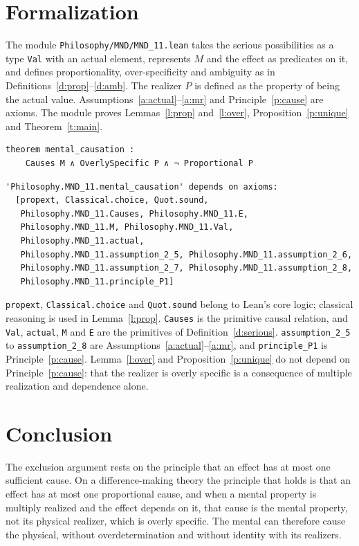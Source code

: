 \documentclass{situationist-preprint}
\begin{document}
\section{Formalization}

The module \nolinkurl{Philosophy/MND/MND_11.lean} takes the serious possibilities as a type \texttt{Val} with an actual element, represents $M$ and the effect as predicates on it, and defines proportionality, over-specificity and ambiguity as in Definitions~\ref{d:prop}--\ref{d:amb}. The realizer $P$ is defined as the property of being the actual value. Assumptions~\ref{a:actual}--\ref{a:mr} and Principle~\ref{p:cause} are axioms. The module proves Lemmas~\ref{l:prop} and~\ref{l:over}, Proposition~\ref{p:unique} and Theorem~\ref{t:main}.

\begin{lstlisting}
theorem mental_causation :
    Causes M ∧ OverlySpecific P ∧ ¬ Proportional P
\end{lstlisting}

\begin{lstlisting}
'Philosophy.MND_11.mental_causation' depends on axioms:
  [propext, Classical.choice, Quot.sound,
   Philosophy.MND_11.Causes, Philosophy.MND_11.E,
   Philosophy.MND_11.M, Philosophy.MND_11.Val,
   Philosophy.MND_11.actual,
   Philosophy.MND_11.assumption_2_5, Philosophy.MND_11.assumption_2_6,
   Philosophy.MND_11.assumption_2_7, Philosophy.MND_11.assumption_2_8,
   Philosophy.MND_11.principle_P1]
\end{lstlisting}

\texttt{propext}, \texttt{Classical.choice} and \texttt{Quot.sound} belong to Lean's core logic; classical reasoning is used in Lemma~\ref{l:prop}. \texttt{Causes} is the primitive causal relation, and \texttt{Val}, \texttt{actual}, \texttt{M} and \texttt{E} are the primitives of Definition~\ref{d:serious}. \texttt{assumption\_2\_5} to \texttt{assumption\_2\_8} are Assumptions~\ref{a:actual}--\ref{a:mr}, and \texttt{principle\_P1} is Principle~\ref{p:cause}. Lemma~\ref{l:over} and Proposition~\ref{p:unique} do not depend on Principle~\ref{p:cause}: that the realizer is overly specific is a consequence of multiple realization and dependence alone.

\section{Conclusion}

The exclusion argument rests on the principle that an effect has at most one sufficient cause. On a difference-making theory the principle that holds is that an effect has at most one proportional cause, and when a mental property is multiply realized and the effect depends on it, that cause is the mental property, not its physical realizer, which is overly specific. The mental can therefore cause the physical, without overdetermination and without identity with its realizers.
\end{document}
